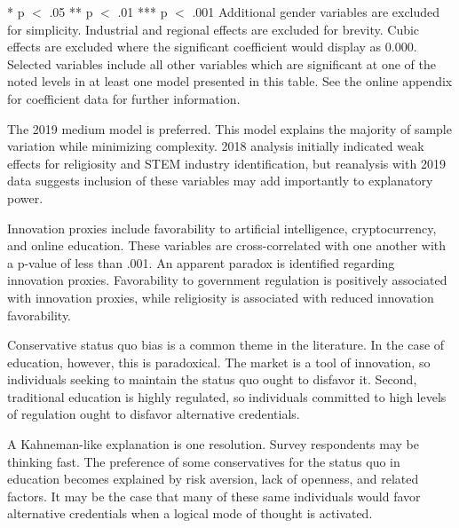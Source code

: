 \documentclass[review]{elsarticle}
\begin{document}
\begin{table}
\begin{tabular}{lllll}
            \end{tabular}
            \begin{tablenotes}
                * p $<$ .05
                ** p $<$ .01
                *** p $<$ .001
                Additional gender variables are excluded for simplicity.
                Industrial and regional effects are excluded for brevity.
                Cubic effects are excluded where the significant coefficient would display as 0.000.
                Selected variables include all other variables which are significant at one of the noted levels in at least one model presented in this table.
                See the online appendix for coefficient data for further information.
            \end{tablenotes}
            \label{tab:models}
            \end{table}
        
        The 2019 medium model is preferred. This model explains the majority of sample variation
        while minimizing complexity.
        2018 analysis initially indicated weak effects for religiosity and STEM industry identification,
        but reanalysis with 2019 data suggests inclusion of these variables may add importantly to
        explanatory power.
        
        Innovation proxies include favorability to artificial
        intelligence, cryptocurrency, and online education. These variables are
        cross-correlated with one another with a p-value of less than .001.
        An apparent paradox is identified regarding innovation proxies.
        Favorability to government regulation is positively associated with
        innovation proxies, while religiosity is associated with reduced
        innovation favorability.
        
        Conservative status quo bias is a common theme in the literature\cite{eidelman2012bias}.
        In the case of education, however, this is paradoxical.
        The market is a tool of innovation\cite{baumol2002free},
        so individuals seeking to maintain the status quo ought to disfavor it.
        Second, traditional education is highly regulated,
        so individuals committed to high levels of regulation ought to disfavor
        alternative credentials.

        A Kahneman-like explanation is one resolution.
        Survey respondents may be thinking fast\cite{kahneman2011thinking}.
        The preference of some conservatives for the status quo in education becomes explained by
        risk aversion, lack of openness, and related factors.
        It may be the case that many of these same individuals would favor alternative
        credentials when a logical mode of thought is activated.
        
\end{document}
